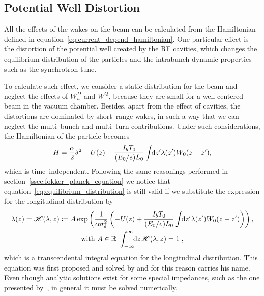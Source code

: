 \subsection{Potential Well Distortion}

    All the effects of the wakes on the beam can be calculated from the Hamiltonian defined in equation~\eqref{eq:current_depend_hamiltonian}. One particular effect is the distortion of the potential well created by the RF cavities, which changes the equilibrium distribution of the particles and the intrabunch dynamic properties such as the synchrotron tune.

    To calculate such effect, we consider a static distribution for the beam and neglect the effects of $W^D_u$ and $W^Q$, because they are small for a well centered beam in the vacuum chamber. Besides, apart from the effect of cavities,
    the distortions are dominated by short--range wakes, in such a way that we can neglect the multi--bunch and multi--turn contributions. Under such considerations, the Hamiltonian of the particle becomes
    \begin{align}
        H = \frac\alpha2\delta^2 + U(z) -
            \frac{I_bT_0}{(E_0/e)L_0}\int\!\!\text{d}z' \lambda(z') W_0(z-z'),
    \end{align}
    which is time--independent. Following the same reasonings performed in section~\ref{ssec:fokker_planck_equation} we notice that equation~\eqref{eq:equilibrium_distribution} is still valid if we substitute the expression for the longitudinal distribution by
    \begin{gather}\label{eq:haissinski_equation}
        \lambda(z) = \mathscr{H}(\lambda,z) \coloneqq A\exp\left(\frac{1}{\alpha\sigma_\delta^2}\left(
            -U(z) + \frac{I_bT_0}{(E_0/e)L_0}\int\!\!\text{d}z' \lambda(z') W_0(z-z')\right)\right),\\\nonumber
            \text{with}\,\,A \in \mathbb{R} \left| \int_{-\infty}^{\infty}\!\!\text{d}z \mathscr{H}(\lambda,z)=1\right.,
    \end{gather}
    which is a transcendental integral equation for the longitudinal distribution. This equation was first proposed and solved by  and for this reason carries his name. Even though analytic solutions exist for some special impedances, such as the one presented by~, in general it must be solved numerically.

